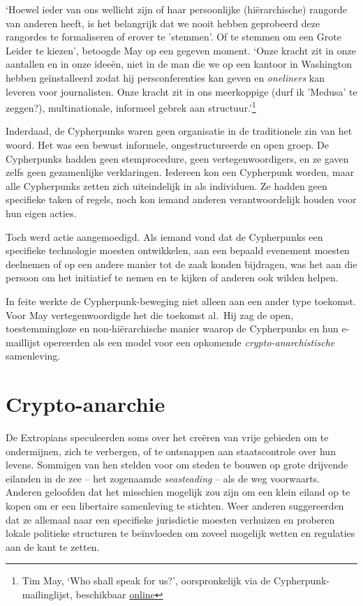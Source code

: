 \documentclass[
  a5paper,
  smalldemyvopaper,11pt,twoside,onecolumn,openright,extrafontsizes]{memoir}
\begin{document}
`Hoewel ieder van ons wellicht zijn of haar persoonlijke (hiërarchische)
rangorde van anderen heeft, is het belangrijk dat we nooit hebben
geprobeerd deze rangordes te formaliseren of erover te 'stemmen'. Of te
stemmen om een Grote Leider te kiezen', betoogde May op een gegeven
moment. `Onze kracht zit in onze aantallen en in onze ideeën, niet in de
man die we op een kantoor in Washington hebben geïnstalleerd zodat hij
persconferenties kan geven en \emph{oneliners} kan leveren voor
journalisten. Onze kracht zit in ons meerkoppige (durf ik 'Medusa' te
zeggen?), multinationale, informeel gebrek aan structuur.'\footnote{Tim
  May, `Who shall speak for us?', oorspronkelijk via de
  Cypherpunk-mailinglijst, beschikbaar
  \href{https://cypherpunks.venona.com/date/1995/09/msg02189.html}{online}}

Inderdaad, de Cypherpunks waren geen organisatie in de traditionele zin
van het woord. Het was een bewust informele, ongestructureerde en open
groep. De Cypherpunks hadden geen stemprocedure, geen
vertegenwoordigers, en ze gaven zelfs geen gezamenlijke verklaringen.
Iedereen kon een Cypherpunk worden, maar alle Cypherpunks zetten zich
uiteindelijk in als individuen. Ze hadden geen specifieke taken of
regels, noch kon iemand anderen verantwoordelijk houden voor hun eigen
acties.

Toch werd actie aangemoedigd. Als iemand vond dat de Cypherpunks een
specifieke technologie moesten ontwikkelen, aan een bepaald evenement
moesten deelnemen of op een andere manier tot de zaak konden bijdragen,
was het aan die persoon om het initiatief te nemen en te kijken of
anderen ook wilden helpen.

In feite werkte de Cypherpunk-beweging niet alleen aan een ander type
toekomst. Voor May vertegenwoordigde het die toekomst al.~Hij zag de
open, toestemmingloze en non-hiërarchische manier waarop de Cypherpunks
en hun e-maillijst opereerden als een model voor een opkomende
\emph{crypto-anarchistische} samenleving.

\section{Crypto-anarchie}\label{crypto-anarchie}

De Extropians speculeerden soms over het creëren van vrije gebieden om
te ondermijnen, zich te verbergen, of te ontsnappen aan staatscontrole
over hun levens. Sommigen van hen stelden voor om steden te bouwen op
grote drijvende eilanden in de zee -- het zogenaamde \emph{seasteading}
-- als de weg voorwaarts. Anderen geloofden dat het misschien mogelijk
zou zijn om een klein eiland op te kopen om er een libertaire
samenleving te stichten. Weer anderen suggereerden dat ze allemaal naar
een specifieke jurisdictie moesten verhuizen en proberen lokale
politieke structuren te beïnvloeden om zoveel mogelijk wetten en
regulaties aan de kant te zetten.
\end{document}

